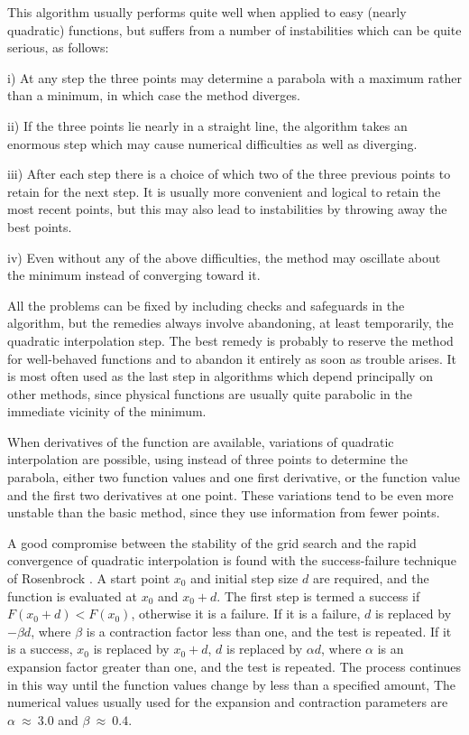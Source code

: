      This algorithm usually performs quite well when applied to easy
(nearly quadratic) functions, but suffers from a number of instabilities
which can be quite serious, as follows:
 
  i) At any step the three points may determine a parabola with a maximum
     rather than a minimum, in which case the method diverges.
 
 ii) If the three points lie nearly in a straight line, the algorithm
     takes an enormous step which may cause numerical difficulties as
     well as diverging.
 
iii) After each step there is a choice of which two of the three previous
     points to retain for the next step.  It is usually more convenient
     and logical to retain the most recent points, but this may also lead
     to instabilities by throwing away the best points.
 
 iv) Even without any of the above difficulties, the method may oscillate
     about the minimum instead of converging toward it.
 
     All the problems can be fixed by including checks and safeguards in
the algorithm, but the remedies always involve abandoning, at least
temporarily, the quadratic interpolation step.
The best remedy is probably
to reserve the method for well-behaved functions and to abandon it
entirely as soon as trouble arises.  It is most often used as the last
step in algorithms which depend principally on other methods, since
physical functions are usually quite parabolic in the immediate
vicinity of the minimum.
 
     When derivatives of the function are available, variations of
quadratic interpolation are possible, using instead of three points to
determine the parabola, either two function values and one first
derivative, or the function value and the first two derivatives at one
point. These
variations tend to be even more unstable than the basic method, since
they use information from fewer points.
 
 
 
     A good compromise between the stability of the grid search and the
rapid convergence of quadratic interpolation is found with the
success-failure
 technique of Rosenbrock \cite{Rose}.  A start point $x_0$ and initial step size
$d$ are required, and the function is evaluated at $x_0$ and $x_0 + d$.  The first
step is termed a success if $F(x_0 + d)< F(x_0)$, otherwise it is a failure. 
If it is a failure, $d$ is replaced by $-\beta d$, where $\beta$ is a contraction
factor less than one, and the test is repeated.  If it is a success, $x_0$ is
replaced by $x_{0} + d$, $d$ is replaced by $\alpha d$, where  $\alpha$ is an expansion factor
greater than one, and the test is repeated.  The process continues in
this way until the function values change by less than a specified amount,
The numerical values usually used for the expansion and contraction
parameters are $\alpha~\approx~3.0$ and $\beta~\approx~0.4.$
 

